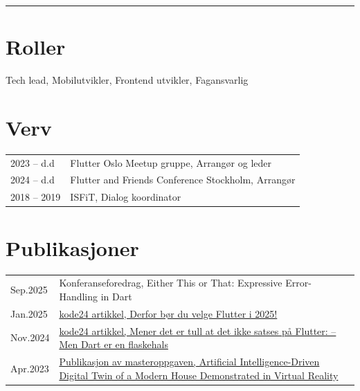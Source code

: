 \documentclass[a4paper,10pt]{article}
\begin{document}
\begin{paracol}{2}
\vspace{0.5em} 
\noindent\rule{\linewidth}{0.2pt}

\section{\ubuntu Roller}
Tech lead, \hspace{0.1em}
Mobilutvikler, \hspace{0.1em}
Frontend utvikler, \hspace{0.1em}
Fagansvarlig

\end{paracol}

\newpage

\section{Verv}
\begin{tabularx}{\linewidth}{@{}lX@{}}
2023 -- d.d & Flutter Oslo Meetup gruppe, Arrangør og leder \\
2024 -- d.d & Flutter and Friends Conference Stockholm, Arrangør \\
2018 -- 2019 & ISFiT, Dialog koordinator \\
\end{tabularx}
\vspace{1em}

\section{Publikasjoner}
\begin{tabularx}{\linewidth}{@{}lX@{}}
Sep.2025 & 
Konferanseforedrag, Either This or That: Expressive Error-Handling in Dart \\
Jan.2025 & 
\href{https://www.kode24.no/artikkel/derfor-bor-du-velge-flutter-i-2025/82529763}{kode24 artikkel, Derfor bør du velge Flutter i 2025!} \\
Nov.2024 & 
\href{https://www.kode24.no/artikkel/mener-det-er-tull-at-det-ikke-satses-pa-flutter-men-dart-er-en-flaskehals/82169214}{kode24 artikkel, Mener det er tull at det ikke satses på Flutter: – Men Dart er en flaskehals} \\
Apr.2023 & 
\href{https://ieeexplore.ieee.org/document/10093855/citations?tabFilter=papers\#citations}{Publikasjon av masteroppgaven, Artificial Intelligence-Driven Digital Twin of a Modern House Demonstrated in Virtual Reality} \\
\end{tabularx}
\vspace{1em}
\end{document}
